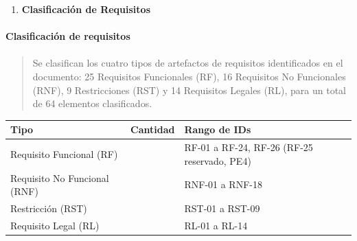 \documentclass[
]{article}
\newcounter{none} %
\begin{document}
\begin{enumerate}
\def\labelenumi{\arabic{enumi}.}
\item
  \protect{}\label{_bookmark59}{}\textbf{Clasificación de
  Requisitos}
\end{enumerate}

\paragraph{Clasificación de
requisitos}\label{clasificaciuxf3n-de-requisitos}

\paragraph{}\label{section-10}

\begin{quote}
Se clasifican los cuatro tipos de artefactos de requisitos identificados
en el documento: 25 Requisitos Funcionales (RF), 16 Requisitos No
Funcionales (RNF), 9 Restricciones (RST) y 14 Requisitos Legales (RL),
para un total de 64 elementos clasificados.
\end{quote}

{\def\LTcaptype{none} %
\begin{longtable}[]{@{}
  >{\centering\arraybackslash}p{}
  >{\centering\arraybackslash}p{}
  >{\centering\arraybackslash}p{}@{}}
\toprule\noalign{}
\begin{minipage}[b]{\linewidth}\centering
\textbf{Tipo}
\end{minipage} & \begin{minipage}[b]{\linewidth}\centering
\textbf{Cantidad}
\end{minipage} & \begin{minipage}[b]{\linewidth}\centering
\textbf{Rango de IDs}
\end{minipage} \\
\midrule\noalign{}
\endhead
\bottomrule\noalign{}
\endlastfoot
Requisito Funcional (RF) & 25 & RF-01 a RF-24, RF-26 (RF-25 reservado,
PE4) \\
Requisito No Funcional (RNF) & 18 & RNF-01 a RNF-18 \\
Restricción (RST) & 9 & RST-01 a RST-09 \\
Requisito Legal (RL) & 14 & RL-01 a RL-14 \\
\end{longtable}
}
\end{document}

